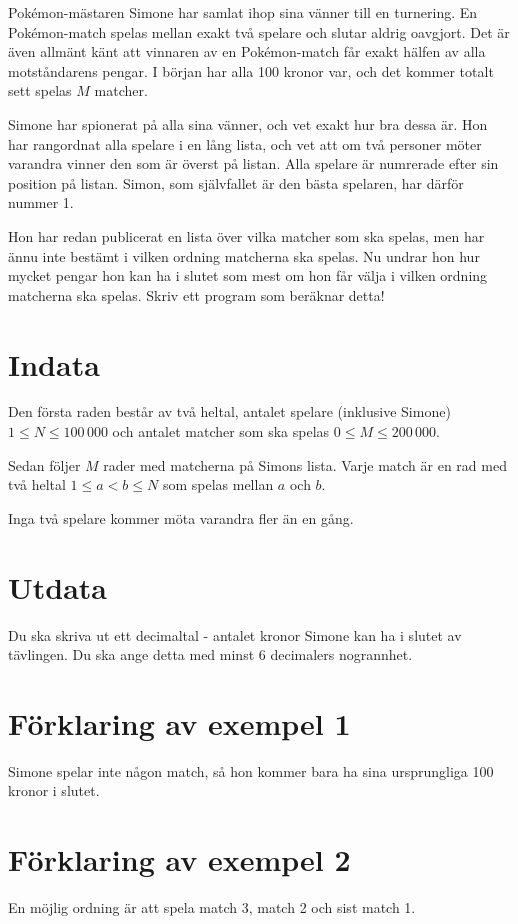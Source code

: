 Pokémon-mästaren Simone har samlat ihop sina vänner till en turnering. En Pokémon-match spelas mellan exakt två spelare och slutar aldrig oavgjort. Det är även allmänt känt att vinnaren av en Pokémon-match får exakt hälfen av alla motståndarens pengar. I början har alla 100 kronor var, och det kommer totalt sett spelas $M$ matcher.

Simone har spionerat på alla sina vänner, och vet exakt hur bra dessa är. Hon har rangordnat alla spelare i en lång lista, och vet att om två personer möter varandra vinner den som är överst på listan. Alla spelare är numrerade efter sin position på listan. Simon, som självfallet är den bästa spelaren, har därför nummer 1.

Hon har redan publicerat en lista över vilka matcher som ska spelas, men har ännu inte bestämt i vilken ordning matcherna ska spelas. Nu undrar hon hur mycket pengar hon kan ha i slutet som mest om hon får välja i vilken ordning matcherna ska spelas. Skriv ett program som beräknar detta!

\section*{Indata}
Den första raden består av två heltal, antalet spelare (inklusive Simone) $1 \leq N \leq 100\,000$ och antalet matcher som ska spelas $0 \leq M \le 200\,000$.

Sedan följer $M$ rader med matcherna på Simons lista. Varje match är en rad med två heltal $1 \le a < b \le N$ som spelas mellan $a$ och $b$.

Inga två spelare kommer möta varandra fler än en gång.

\section*{Utdata}
Du ska skriva ut ett decimaltal - antalet kronor Simone kan ha i slutet av tävlingen. Du ska ange detta med minst $6$ decimalers nogrannhet.

\section*{Förklaring av exempel 1}
Simone spelar inte någon match, så hon kommer bara ha sina ursprungliga 100 kronor i slutet.

\section*{Förklaring av exempel 2}
En möjlig ordning är att spela  match 3, match 2 och sist match 1.

